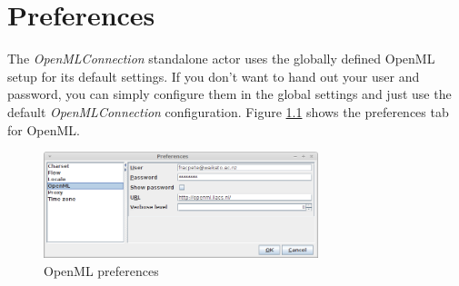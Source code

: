\documentclass[a4paper]{book}
\begin{document}
\chapter{Preferences}
\label{preferences}
The \textit{OpenMLConnection} standalone actor uses the globally defined
OpenML setup for its default settings. If you don't want to hand out your
user and password, you can simply configure them in the global
settings and just use the default \textit{OpenMLConnection} configuration.
Figure \ref{openml_preferences} shows the preferences tab for OpenML.
\begin{figure}[htb]
  \centering
  \includegraphics[width=8.0cm]{images/openml_preferences.png}
  \caption{OpenML preferences}
  \label{openml_preferences}
\end{figure}


\end{document}
